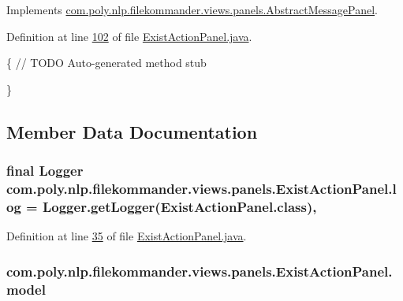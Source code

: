 Implements \hyperlink{classcom_1_1poly_1_1nlp_1_1filekommander_1_1views_1_1panels_1_1_abstract_message_panel_a305ad7e0b41448b92cfc567062fbb874}{com.\-poly.\-nlp.\-filekommander.\-views.\-panels.\-Abstract\-Message\-Panel}.



Definition at line \hyperlink{L102}{102} of file \hyperlink{}{Exist\-Action\-Panel.\-java}.


\begin{DoxyCode}
                                             \{
        \textcolor{comment}{// TODO Auto-generated method stub}
        
    \}
\end{DoxyCode}


\subsection{Member Data Documentation}
\hypertarget{classcom_1_1poly_1_1nlp_1_1filekommander_1_1views_1_1panels_1_1_exist_action_panel_a8aa597230d90247bd48376a632fcbf0e}{
\subsubsection[{log}]{\setlength{\rightskip}{0pt plus 5cm}final Logger com.\-poly.\-nlp.\-filekommander.\-views.\-panels.\-Exist\-Action\-Panel.\-log = Logger.\-get\-Logger(Exist\-Action\-Panel.\-class)\hspace{0.3cm}{\ttfamily [static]}, {\ttfamily [private]}}}\label{classcom_1_1poly_1_1nlp_1_1filekommander_1_1views_1_1panels_1_1_exist_action_panel_a8aa597230d90247bd48376a632fcbf0e}


Definition at line \hyperlink{L35}{35} of file \hyperlink{}{Exist\-Action\-Panel.\-java}.

\hypertarget{classcom_1_1poly_1_1nlp_1_1filekommander_1_1views_1_1panels_1_1_exist_action_panel_add9b7fcb99ef9867cf66a4a43fd0ba2b}{
\subsubsection[{model}]{ com.\-poly.\-nlp.\-filekommander.\-views.\-panels.\-Exist\-Action\-Panel.\-model\hspace{0.3cm}{\ttfamily [private]}}}\label{classcom_1_1poly_1_1nlp_1_1filekommander_1_1views_1_1panels_1_1_exist_action_panel_add9b7fcb99ef9867cf66a4a43fd0ba2b}


